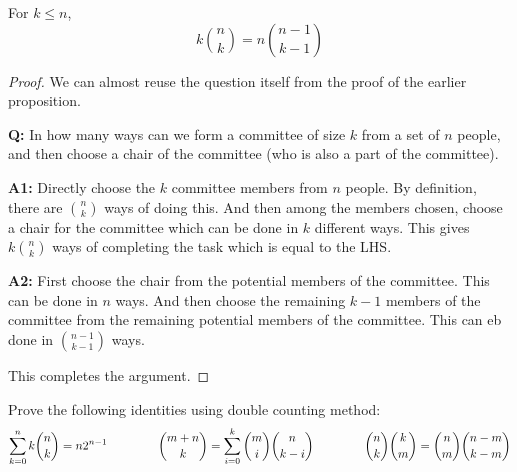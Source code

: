 \begin{proposition}
For $k \le n$,
$$ k{n \choose k} = n {n-1 \choose k-1}$$
\end{proposition}
\begin{proof}
We can almost reuse the question itself from the proof of the earlier proposition.
\begin{description}
\item{\bf Q:} In how many ways can we form a committee of size $k$ from a set of $n$ people, and then choose a chair of the committee (who is also  a part of the committee).
\item{\bf A1:} Directly choose the $k$ committee members from $n$ people. By definition, there are ${n \choose k}$ ways of doing this. And then among the members chosen, choose a chair for the committee which can be done in $k$ different ways. This gives $k {n \choose k}$ ways of completing the task which is equal to the LHS.
\item{\bf  A2:} First choose the chair from the potential members of the committee. This can be done in $n$ ways. And then choose the remaining $k-1$ members of the committee from the remaining potential members of the committee. This can eb done in ${n-1 \choose k-1}$ ways.
\end{description}
This completes the argument.
\end{proof}

\begin{exercise}
Prove the following identities using double counting method:
$$\sum_{k=0}^n k {n \choose k} = n 2^{n-1} \textrm{\hspace{15mm}} {m+n \choose k} = \sum_{i=0}^k {m \choose i}{n \choose k-i} \textrm{\hspace{15mm}} {n \choose k}{k \choose m} = {n \choose m}{n-m \choose k-m}$$
\end{exercise}

